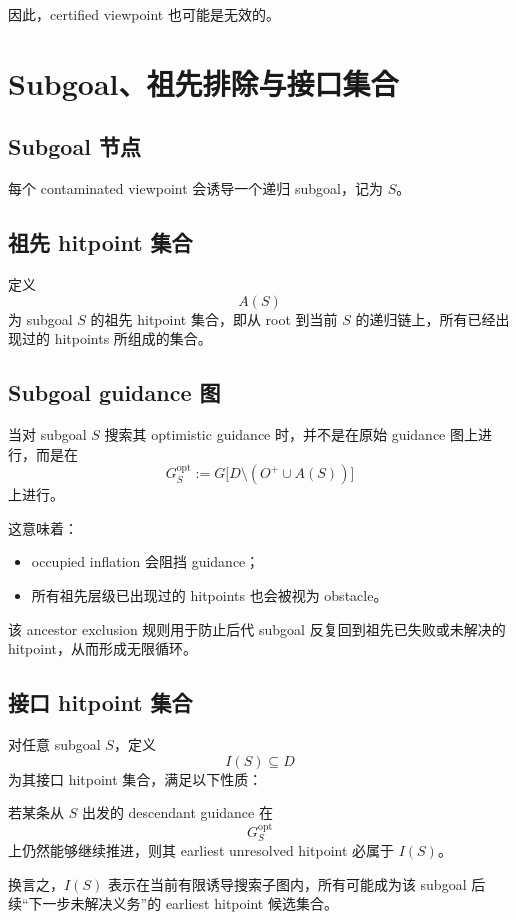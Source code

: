 \documentclass[11pt]{ctexart}
\begin{document}
因此，certified viewpoint 也可能是无效的。

\section{Subgoal、祖先排除与接口集合}

\subsection{Subgoal 节点}

每个 contaminated viewpoint 会诱导一个递归 subgoal，记为 $S$。

\subsection{祖先 hitpoint 集合}

定义
\[
A(S)
\]
为 subgoal $S$ 的祖先 hitpoint 集合，即从 root 到当前 $S$ 的递归链上，所有已经出现过的 hitpoints 所组成的集合。

\subsection{Subgoal guidance 图}

当对 subgoal $S$ 搜索其 optimistic guidance 时，并不是在原始 guidance 图上进行，而是在
\[
G^{\mathrm{opt}}_S
:= G\big[D\setminus (O^{+}\cup A(S))\big]
\]
上进行。

这意味着：
\begin{itemize}[leftmargin=2em]
    \item occupied inflation 会阻挡 guidance；
    \item 所有祖先层级已出现过的 hitpoints 也会被视为 obstacle。
\end{itemize}

该 ancestor exclusion 规则用于防止后代 subgoal 反复回到祖先已失败或未解决的 hitpoint，从而形成无限循环。

\subsection{接口 hitpoint 集合}

对任意 subgoal $S$，定义
\[
I(S)\subseteq D
\]
为其接口 hitpoint 集合，满足以下性质：

若某条从 $S$ 出发的 descendant guidance 在
\[
G^{\mathrm{opt}}_S
\]
上仍然能够继续推进，则其 earliest unresolved hitpoint 必属于 $I(S)$。

换言之，$I(S)$ 表示在当前有限诱导搜索子图内，所有可能成为该 subgoal 后续“下一步未解决义务”的 earliest hitpoint 候选集合。
\end{document}
